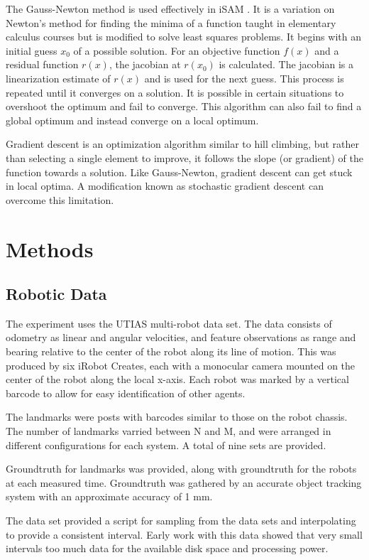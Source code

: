 \documentclass[12pt]{report}
\begin{document}
	The Gauss-Newton method is used effectively in iSAM \cite{isam}.  It is a variation on Newton’s method for finding the minima of a function taught in elementary calculus courses but is modified to solve least squares problems.  It begins with an initial guess $x_0$ of a possible solution.  For an objective function $f(x)$ and a residual function $r(x)$, the jacobian at $r(x_0)$ is calculated.  The jacobian is a linearization estimate of $r(x)$ and is used for the next guess.  This process is repeated until it converges on a solution.  It is possible in certain situations to overshoot the optimum and fail to converge.  This algorithm can also fail to find a global optimum and instead converge on a local optimum.
	
	Gradient descent is an optimization algorithm similar to hill climbing, but rather than selecting a single element to improve, it follows the slope (or gradient) of the function towards a solution.  Like Gauss-Newton, gradient descent can get stuck in local optima.  A modification known as stochastic gradient descent can overcome this limitation.  


\chapter{Methods}
\section{Robotic Data}
The experiment uses the UTIAS multi-robot data set.  The data consists of odometry as linear and angular velocities, and feature observations as range and bearing relative to the center of the robot along its line of motion.  This was produced by six iRobot Creates, each with a monocular camera mounted on the center of the robot along the local x-axis.  Each robot was marked by a vertical barcode to allow for easy identification of other agents.

The landmarks were posts with barcodes similar to those on the robot chassis.  The number of landmarks varried between N and M, and were arranged in different configurations for each system.  A total of nine sets are provided.

Groundtruth for landmarks was provided, along with groundtruth for the robots at each measured time.  Groundtruth was gathered by an accurate object tracking system with an approximate accuracy of 1 mm.

The data set provided a script for sampling from the data sets and interpolating to provide a consistent interval.  Early work with this data showed that very small intervals too much data for the available disk space and processing power.  
\end{document}
